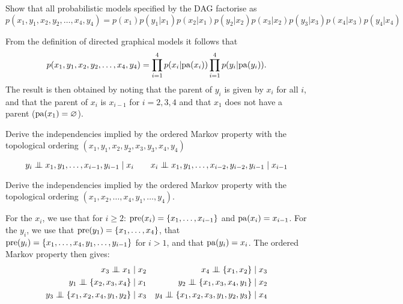\begin{exenumerate}
  \item Show that all probabilistic models specified by the DAG factorise as
    $$p(x_1,y_1, x_2, y_2, \ldots,x_4,y_4) = p(x_1)p(y_1|x_1)p(x_2 | x_1)p(y_2|x_2)p(x_3|x_2)p(y_3|x_3)p(x_4|x_3)p(y_4|x_4)$$
    \begin{solution}
      From the definition of directed graphical models it follows that
      $$p(x_1,y_1, x_2, y_2, \ldots,x_4,y_4) = \prod_{i=1}^4 p(x_i |
      \mathrm{pa}(x_i)) \prod_{i=1}^4 p(y_i | \mathrm{pa}(y_i)).$$ The result is then
      obtained by noting that the parent of $y_i$ is given by $x_i$ for all $i$,
      and that the parent of $x_i$ is $x_{i-1}$ for $i=2,3,4$ and that $x_1$ does not have a parent ($\mathrm{pa}(x_1) = \varnothing$).
    \end{solution}
%
  \item Derive the independencies implied by the ordered Markov property with the topological ordering $(x_1, y_1, x_2, y_2, x_3, y_3, x_4, y_4)$

    \begin{solution}
      $$y_i \mathrel{\perp\mspace{-10mu}\perp} x_1, y_1, \ldots, x_{i-1}, y_{i-1} \mid x_i \quad \quad  x_i \mathrel{\perp\mspace{-10mu}\perp} x_1, y_1, \ldots, x_{i-2},y_{i-2},y_{i-1} \mid x_{i-1}$$

      \end{solution}

  \item Derive the independencies implied by the ordered Markov property with the topological ordering $(x_1, x_2, \ldots, x_4, y_1, \ldots, y_4)$.
    \begin{solution} For the $x_i$, we use that for $i \ge 2$: $\mathrm{pre}(x_i) = \{x_1, \ldots, x_{i-1}\}$ and $\mathrm{pa}(x_i) = x_{i-1}$. For the $y_i$, we use that
      $\mathrm{pre}(y_1) = \{x_1,\ldots, x_4\}$, that $\mathrm{pre}(y_i) = \{x_1,\ldots, x_4, y_1, \ldots, y_{i-1}\}$ for $i>1$, and that $\mathrm{pa}(y_i) = x_i$. The ordered Markov property then gives:
  \begin{align*}
    x_3 \independent x_1 \mid x_2 && x_4 \independent \{x_1,x_2\} \mid x_3\\
    y_1 \independent \{x_2, x_3, x_4\} \mid x_1 &&  y_2 \independent \{x_1, x_3, x_4, y_1\} \mid x_2 \\
    y_3 \independent \{x_1, x_2, x_4, y_1, y_2\} \mid x_3 &&  y_4 \independent \{x_1, x_2, x_3, y_1, y_2, y_3\} \mid x_4
  \end{align*}

    \end{solution}


\end{exenumerate}

